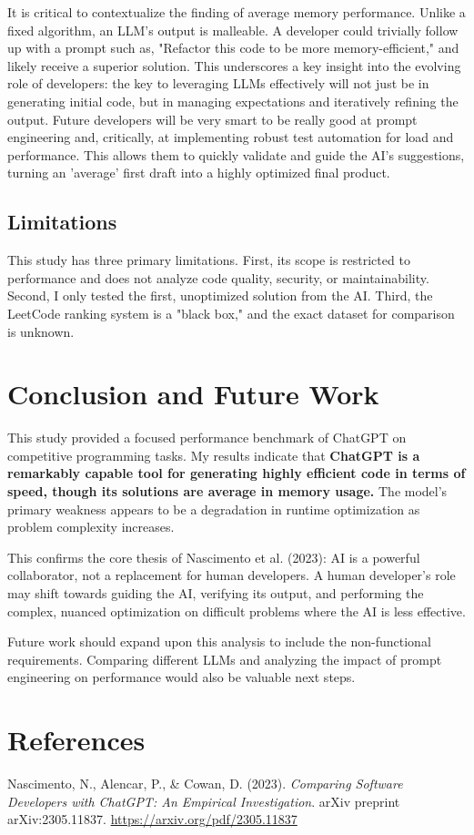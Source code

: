 \documentclass[12pt, a4paper]{article}
\begin{document}
It is critical to contextualize the finding of average memory performance. Unlike a fixed algorithm, an LLM's output is malleable. A developer could trivially follow up with a prompt such as, "Refactor this code to be more memory-efficient," and likely receive a superior solution. This underscores a key insight into the evolving role of developers: the key to leveraging LLMs effectively will not just be in generating initial code, but in managing expectations and iteratively refining the output. Future developers will be very smart to be really good at prompt engineering and, critically, at implementing robust test automation for load and performance. This allows them to quickly validate and guide the AI's suggestions, turning an 'average' first draft into a highly optimized final product.

\subsection{Limitations}
This study has three primary limitations. First, its scope is restricted to performance and does not analyze code quality, security, or maintainability. Second, I only tested the first, unoptimized solution from the AI. Third, the LeetCode ranking system is a "black box," and the exact dataset for comparison is unknown.

\section{Conclusion and Future Work}

This study provided a focused performance benchmark of ChatGPT on competitive programming tasks. My results indicate that \textbf{ChatGPT is a remarkably capable tool for generating highly efficient code in terms of speed, though its solutions are average in memory usage.} The model's primary weakness appears to be a degradation in runtime optimization as problem complexity increases.

This confirms the core thesis of Nascimento et al. (2023): AI is a powerful collaborator, not a replacement for human developers. A human developer's role may shift towards guiding the AI, verifying its output, and performing the complex, nuanced optimization on difficult problems where the AI is less effective.

Future work should expand upon this analysis to include the non-functional requirements. Comparing different LLMs and analyzing the impact of prompt engineering on performance would also be valuable next steps.

\section{References}

Nascimento, N., Alencar, P., \& Cowan, D. (2023). \textit{Comparing Software Developers with ChatGPT: An Empirical Investigation}. arXiv preprint arXiv:2305.11837. \url{https://arxiv.org/pdf/2305.11837}
\end{document}
